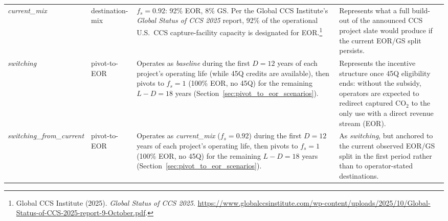 \documentclass[11pt]{article}
\newcommand{\cotwo}{\ensuremath{\mathrm{CO_2}}}
\newcommand{\cotwoe}{\ensuremath{\mathrm{CO_{2}e}}}
\newcommand{\chfour}{\ensuremath{\mathrm{CH_4}}}
\begin{document}
\begin{table}[htbp]
\begin{tabular}{@{}l l >{\raggedright\arraybackslash}p{5.5cm} >{\raggedright\arraybackslash}p{4.5cm}@{}}
\addlinespace
\emph{current\_mix} & destination-mix & $f_s = 0.92$: 92\% EOR, 8\% GS. Per the Global CCS Institute's \emph{Global Status of CCS 2025} report, 92\% of the operational U.S.\ CCS capture-facility capacity is designated for EOR.\footnote{Global CCS Institute (2025). \emph{Global Status of CCS 2025}. \url{https://www.globalccsinstitute.com/wp-content/uploads/2025/10/Global-Status-of-CCS-2025-report-9-October.pdf}.}                                                                                                                                                                                              & Represents what a full build-out of the announced CCS project slate would produce if the current EOR/GS split persists. \\
\addlinespace
\emph{switching}                & pivot-to-EOR    & Operates as \emph{baseline} during the first $D = 12$ years of each project's operating life (while 45Q credits are available), then pivots to $f_s = 1$ (100\% EOR, no 45Q) for the remaining $L - D = 18$ years (Section~\ref{sec:pivot_to_eor_scenarios}).                                                                                                                                                                                                     & Represents the incentive structure once 45Q eligibility ends: without the subsidy, operators are expected to redirect captured \cotwo{} to the only use with a direct revenue stream (EOR). \\
\addlinespace
\emph{switching\_from\_current} & pivot-to-EOR    & Operates as \emph{current\_mix} ($f_s = 0.92$) during the first $D = 12$ years of each project's operating life, then pivots to $f_s = 1$ (100\% EOR, no 45Q) for the remaining $L - D = 18$ years (Section~\ref{sec:pivot_to_eor_scenarios}).                                                                                                                                                                                                                      & As \emph{switching}, but anchored to the current observed EOR/GS split in the first period rather than to operator-stated destinations. \\
\bottomrule
\end{tabular}
\end{table}%
\clearpage
\end{document}
